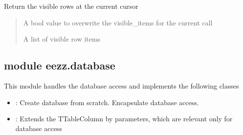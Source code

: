 \documentclass[letterpaper,10pt,english]{sphinxmanual}
\begin{document}
\begin{savenotes}
\begin{fulllineitems}
\begin{savenotes}
\begin{fulllineitems}
\end{fulllineitems}\end{savenotes}


\begin{savenotes}\begin{fulllineitems}
\label{\detokenize{eezz:eezz.blueserv.TBluetooth.get_visible_rows}}
\pysigstartsignatures
{}
\pysigstopsignatures
\sphinxAtStartPar
Return the visible rows at the current cursor
\begin{quote}\begin{description}
\sphinxAtStartPar
{} \textendash{} A bool value to overwrite the visible\_items for the current call

\sphinxAtStartPar
A list of visible row items

\end{description}\end{quote}

\end{fulllineitems}\end{savenotes}


\end{fulllineitems}\end{savenotes}



\subsection{module eezz.database}
\label{\detokenize{eezz:module-eezz.database}}\label{\detokenize{eezz:module-eezz-database}}
\sphinxAtStartPar
This module handles the database access and implements the following classes
\begin{itemize}
\item {} 
\sphinxAtStartPar
{\hyperref[\detokenize{eezz:eezz.database.TDatabaseTable}]{}}: Create database from scratch. Encapsulate database access.

\item {} 
\sphinxAtStartPar
{\hyperref[\detokenize{eezz:eezz.database.TDatabaseColumn}]{}}: Extends the TTableColumn by parameters, which are relevant only for database access

\end{itemize}
\end{document}
